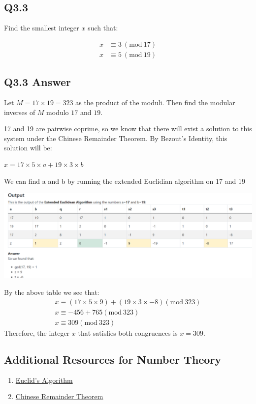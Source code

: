 \documentclass{article}
\begin{document}
\subsection*{Q3.3}
Find the smallest integer $x$ such that:

\begin{align*}
x &\equiv 3 \ (\text{mod}\ 17) \\
x &\equiv 5 \ (\text{mod}\ 19)
\end{align*}

\newpage
\subsection*{Q3.3 Answer}

Let $M = 17 \times 19 = 323$ as the product of the moduli. Then find the modular inverses of $M$ modulo $17$ and $19$.

17 and 19 are pairwise coprime, so we know that there will exist a solution to this
system under the Chinese Remainder Theorem. By Bezout's Identity, this solution will be:

$x = 17 \times 5 \times a + 19 \times 3 \times b$

We can find a and b by running the extended Euclidian algorithm on 17 and 19

\includegraphics{extended_euclidian.png}

By the above table we see that: 
\begin{align*}
x \equiv (17 \times 5 \times 9) + (19 \times 3 \times -8)  (\text{mod}~ 323)\\
x \equiv -456 + 765 (\text{mod} ~323) \\
x \equiv 309 (\text{mod}~ 323)
\end{align*}
Therefore, the integer $x$ that satisfies both congruences is $x = 309$.

\newpage

\subsection*{Additional Resources for Number Theory}
\begin{enumerate}
    \item \href{https://www.youtube.com/watch?v=yHwneN6zJmU}{Euclid's Algorithm}
    \item \href{https://www.youtube.com/watch?v=ru7mWZJlRQg&t=276s}{Chinese Remainder Theorem} 
\end{enumerate}
\newpage
\end{document}
